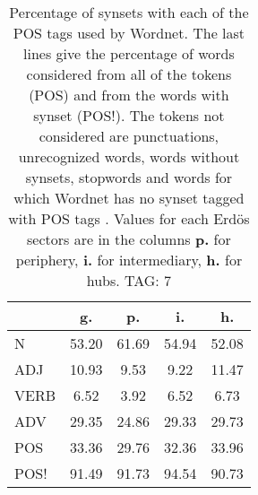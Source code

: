 \begin{table}[h!]
\begin{center}
\begin{tabular}{| l | c | c | c | c |}\hline
 & g. & p. & i. & h. \\\hline
N & 53.20  & 61.69  & 54.94  & 52.08 \\\hline
ADJ & 10.93  & 9.53  & 9.22  & 11.47 \\\hline
VERB & 6.52  & 3.92  & 6.52  & 6.73 \\\hline
ADV & 29.35  & 24.86  & 29.33  & 29.73 \\\hline
POS & 33.36  & 29.76  & 32.36  & 33.96 \\\hline
POS! & 91.49  & 91.73  & 94.54  & 90.73 \\\hline
\end{tabular}
\caption{Percentage of synsets with each of the POS tags used by Wordnet. The last lines give the percentage of words considered from all of the tokens (POS) and from the words with synset (POS!). The tokens not considered are punctuations, unrecognized words, words without synsets, stopwords and words for which Wordnet has no synset  tagged with POS tags . Values for each Erd\"os sectors are in the columns {{\bf p.}} for periphery, {{\bf i.}} for intermediary, {{\bf h.}} for hubs. TAG: 7}
\end{center}
\end{table}